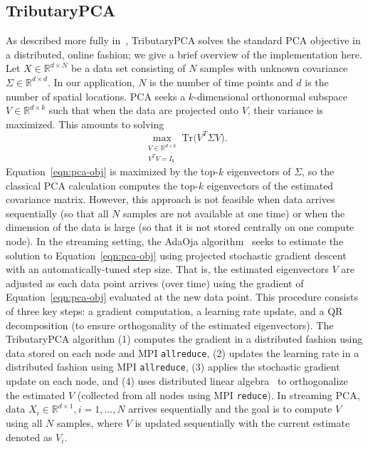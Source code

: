 \documentclass{juliacon}
\begin{document}
\subsection{TributaryPCA} 
As described more fully in~\cite{wang2021tributarypca}, TributaryPCA solves the standard PCA objective in a distributed, online fashion; we give a brief overview of the implementation here.
Let $X \in \mathbb{R}^{d \times N}$ be a data set consisting of $N$ samples with unknown covariance $\Sigma \in \mathbb{R}^{d \times d}$. 
In our application, $N$ is the number of time points and $d$ is the number of spatial locations.
PCA seeks a $k$-dimensional orthonormal subspace $V \in \mathbb{R}^{d \times k}$ such that when the data are projected onto $V$, their variance is maximized. This amounts to solving 
\begin{equation}\label{eqn:pca-obj}
    \max_{\substack{V \in \mathbb{R}^{d \times k} \\ V^TV = I_k}} \text{Tr}\Big(V^T \Sigma V\Big).
\end{equation}
Equation~\eqref{eqn:pca-obj} is maximized by the top-$k$ eigenvectors of $\Sigma$, so the classical PCA calculation computes the top-$k$ eigenvectors of the estimated covariance matrix.
However, this approach is not feasible when data arrives sequentially (so that all $N$ samples are not available at one time) or when the dimension of the data is large (so that it is not stored centrally on one compute node).
In the streaming setting, the AdaOja algorithm~\cite{henriksen2019adaoja} seeks to estimate the solution to Equation~\eqref{eqn:pca-obj} using projected stochastic gradient descent with an automatically-tuned step size.
That is, the estimated eigenvectors $V$ are adjusted as each data point arrives (over time) using the gradient of Equation~\eqref{eqn:pca-obj} evaluated at the new data point.
This procedure consists of three key steps: a gradient computation, a learning rate update, and a QR decomposition (to ensure orthogonality of the estimated eigenvectors).
The TributaryPCA algorithm (1) computes the gradient in a distributed fashion using data stored on each node and MPI \texttt{allreduce}, (2) updates the learning rate in a distributed fashion using MPI \texttt{allreduce}, (3) applies the stochastic gradient update on each node, and (4) uses distributed linear algebra~\cite{demmel2012communication} to orthogonalize the estimated $V$ (collected from all nodes using MPI \texttt{reduce}).
In streaming PCA, data $X_i \in \mathbb{R}^{d \times 1}, i=1,...,N$ arrives sequentially and the goal is to compute $V$ using all $N$ samples, where $V$ is updated sequentially with the current estimate denoted as $V_i$. 
\end{document}
